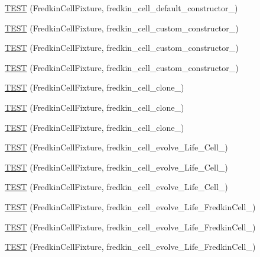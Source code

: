 \begin{DoxyCompactItemize}
\item 
\hyperlink{TestLife_8c_09_09_a9ec000791dfb31181017aab9a918877f}{T\-E\-S\-T} (Fredkin\-Cell\-Fixture, fredkin\-\_\-cell\-\_\-default\-\_\-constructor\-\_)
\item 
\hyperlink{TestLife_8c_09_09_a883a069ea5826c88bb0293cf9e7ce932}{T\-E\-S\-T} (Fredkin\-Cell\-Fixture, fredkin\-\_\-cell\-\_\-custom\-\_\-constructor\-\_)
\item 
\hyperlink{TestLife_8c_09_09_a0222a8b2db9232cbf4487b3819e5a12b}{T\-E\-S\-T} (Fredkin\-Cell\-Fixture, fredkin\-\_\-cell\-\_\-custom\-\_\-constructor\-\_)
\item 
\hyperlink{TestLife_8c_09_09_a6ed58a7b97d8453b756cc1e3fa2cc6a2}{T\-E\-S\-T} (Fredkin\-Cell\-Fixture, fredkin\-\_\-cell\-\_\-custom\-\_\-constructor\-\_)
\item 
\hyperlink{TestLife_8c_09_09_ab6fde36e46c2eafb7b82b5e8ae5ae2a9}{T\-E\-S\-T} (Fredkin\-Cell\-Fixture, fredkin\-\_\-cell\-\_\-clone\-\_)
\item 
\hyperlink{TestLife_8c_09_09_ab5940d52fb05c2596d6b2a3b6eb84b83}{T\-E\-S\-T} (Fredkin\-Cell\-Fixture, fredkin\-\_\-cell\-\_\-clone\-\_)
\item 
\hyperlink{TestLife_8c_09_09_a3a0ca36eaa1d7e68f2d70bdc2645e416}{T\-E\-S\-T} (Fredkin\-Cell\-Fixture, fredkin\-\_\-cell\-\_\-clone\-\_)
\item 
\hyperlink{TestLife_8c_09_09_a14f7877b81d8edf8f5a26ceed7f2b7a5}{T\-E\-S\-T} (Fredkin\-Cell\-Fixture, fredkin\-\_\-cell\-\_\-evolve\-\_\-\-Life\-\_\-\-Cell\-\_)
\item 
\hyperlink{TestLife_8c_09_09_a7e6d2bb9937aef89c8c1ab62382f974e}{T\-E\-S\-T} (Fredkin\-Cell\-Fixture, fredkin\-\_\-cell\-\_\-evolve\-\_\-\-Life\-\_\-\-Cell\-\_)
\item 
\hyperlink{TestLife_8c_09_09_a0a8d0abdcc478973226346770ac63119}{T\-E\-S\-T} (Fredkin\-Cell\-Fixture, fredkin\-\_\-cell\-\_\-evolve\-\_\-\-Life\-\_\-\-Cell\-\_)
\item 
\hyperlink{TestLife_8c_09_09_a71fd900d774e6cd68a4169c88a076505}{T\-E\-S\-T} (Fredkin\-Cell\-Fixture, fredkin\-\_\-cell\-\_\-evolve\-\_\-\-Life\-\_\-\-Fredkin\-Cell\-\_)
\item 
\hyperlink{TestLife_8c_09_09_a34f5bbdc64c1eb559bf42d44a6cb0cdb}{T\-E\-S\-T} (Fredkin\-Cell\-Fixture, fredkin\-\_\-cell\-\_\-evolve\-\_\-\-Life\-\_\-\-Fredkin\-Cell\-\_)
\item 
\hyperlink{TestLife_8c_09_09_a7c15bbf7fe27df22b5b1d21665a81994}{T\-E\-S\-T} (Fredkin\-Cell\-Fixture, fredkin\-\_\-cell\-\_\-evolve\-\_\-\-Life\-\_\-\-Fredkin\-Cell\-\_)

\end{DoxyCompactItemize}
